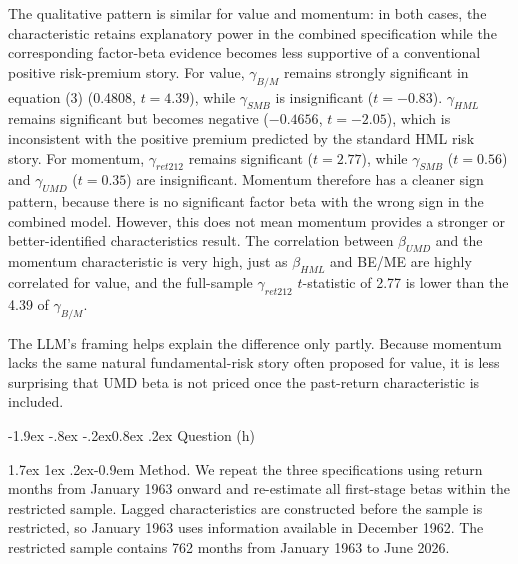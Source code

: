 \documentclass[11pt]{article}
\makeatletter
\renewcommand\subsubsection{\@startsection{subsubsection}{3}{0pt}%
  {-1.9ex \@plus -.8ex \@minus -.2ex}{0.8ex \@plus .2ex}%
  {\normalfont\bfseries\itshape\normalsize\color{psink}}}
\renewcommand\paragraph{\@startsection{paragraph}{4}{0pt}%
  {1.7ex \@plus 1ex \@minus .2ex}{-0.9em}%
  {\normalfont\bfseries\normalsize\color{psink}}}
\newenvironment{tight}
  {\begin{itemize}\setlength{\itemsep}{3pt}\setlength{\parskip}{0pt}%
   \setlength{\topsep}{3pt}\setlength{\leftmargini}{1.4em}}
  {\end{itemize}}
\makeatother
\begin{document}
\begin{tight}
  The qualitative pattern is similar for value and momentum: in both cases, the
  characteristic retains explanatory power in the combined specification while the
  corresponding factor-beta evidence becomes less supportive of a conventional positive
  risk-premium story. For value, $\gamma_{B/M}$ remains strongly significant in equation
  (3) (0.4808, $t = 4.39$), while $\gamma_{SMB}$ is insignificant ($t = -0.83$).
  $\gamma_{HML}$ remains significant but becomes negative ($-0.4656$, $t = -2.05$), which
  is inconsistent with the positive premium predicted by the standard HML risk story. For
  momentum, $\gamma_{ret212}$ remains significant ($t = 2.77$), while $\gamma_{SMB}$
  ($t = 0.56$) and $\gamma_{UMD}$ ($t = 0.35$) are insignificant. Momentum therefore has a
  cleaner sign pattern, because there is no significant factor beta with the wrong sign in
  the combined model. However, this does not mean momentum provides a stronger or
  better-identified characteristics result. The correlation between $\beta_{UMD}$ and the
  momentum characteristic is very high, just as $\beta_{HML}$ and BE/ME are highly
  correlated for value, and the full-sample $\gamma_{ret212}$ $t$-statistic of 2.77 is
  lower than the 4.39 of $\gamma_{B/M}$.

  The LLM's framing helps explain the difference only partly. Because momentum lacks the
  same natural fundamental-risk story often proposed for value, it is less surprising
  that UMD beta is not priced once the past-return characteristic is included.
\end{tight}

\subsubsection{Question (h)}

\paragraph{Method.} We repeat the three specifications using return months from January
1963 onward and re-estimate all first-stage betas within the restricted sample. Lagged
characteristics are constructed before the sample is restricted, so January 1963 uses
information available in December 1962. The restricted sample contains 762 months from
January 1963 to June 2026.
\end{document}

